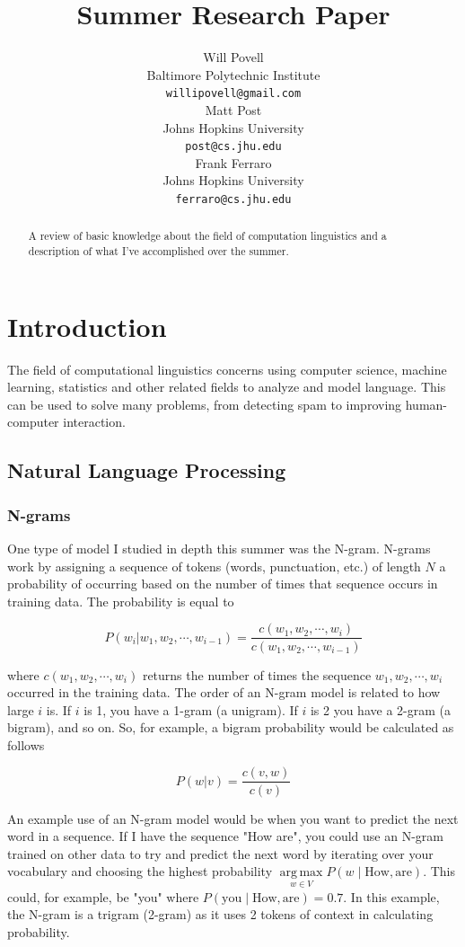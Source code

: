 \documentclass[11pt]{article}
\title{Summer Research Paper}
\author{Will Povell \\
  Baltimore Polytechnic Institute \\
  {\tt willipovell@gmail.com} \\\And
  Matt Post \\
  Johns Hopkins University \\
  {\tt post@cs.jhu.edu} \\\And
  Frank Ferraro \\
  Johns Hopkins University \\
  {\tt ferraro@cs.jhu.edu}}
\date{}
\DeclareMathOperator*{\argmax}{arg\,max}
\begin{document}
\maketitle

\begin{abstract}
  A review of basic knowledge about the field of computation linguistics and a description of what I've accomplished over the summer.
\end{abstract}

\section{Introduction}

The field of computational linguistics concerns using computer science, machine learning, statistics and other related fields to analyze and model language. This can be used to solve many problems, from detecting spam to improving human-computer interaction.

\subsection{Natural Language Processing}

\subsubsection{N-grams}

One type of model I studied in depth this summer was the N-gram. N-grams work by assigning a sequence of tokens (words, punctuation, etc.) of length $N$ a probability of occurring based on the number of times that sequence occurs in training data. The probability is equal to

$$ P\left(w_i \vert w_1, w_2, \cdots, w_{i-1} \right) = \frac{ c\left( w_1, w_2, \cdots, w_i \right) }{ c\left( w_1, w_2, \cdots, w_{i-1} \right) } $$


where $c \left( w_1, w_2, \cdots, w_i \right)$ returns the number of times the sequence $w_1, w_2, \cdots, w_i$ occurred in the training data. The order of an N-gram model is related to how large $i$ is. If $i$ is 1, you have a 1-gram (a unigram). If $i$ is 2 you have a 2-gram (a bigram), and so on.  So, for example, a bigram probability would be calculated as follows

$$ P\left(w \vert v \right) = \frac{ c\left( v, w \right) }{ c\left( v \right) } $$

An example use of an N-gram model would be when you want to predict the next word in a sequence. If I have the sequence "How are", you could use an N-gram trained on other data to try and predict the next word by iterating over your vocabulary and choosing the highest probability $\argmax\limits_{w \in V} P\left( w \; \vert \; \text{How}, \text{are} \right)$. This could, for example, be "you" where $P\left( \text{you} \; \vert \; \text{How}, \text{are} \right) = 0.7$. In this example, the N-gram is a trigram (2-gram) as it uses 2 tokens of context in calculating probability.
\end{document}
